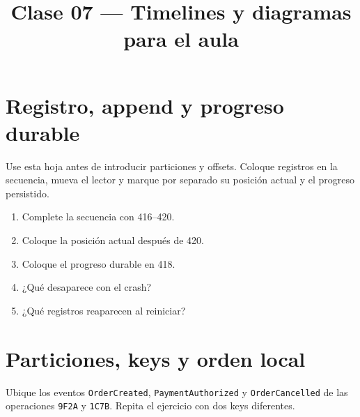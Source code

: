 \documentclass[variant=guia,cover=none,mode=print]{ua-engineering-v6-article}
\title{Clase 07 --- Timelines y diagramas para el aula}
\author{\UAProfessor}
\date{\UADate}
\begin{document}
\maketitle

\section{Registro, append y progreso durable}

Use esta hoja antes de introducir particiones y offsets. Coloque registros en la secuencia, mueva el lector y marque por separado su posición actual y el progreso persistido.

\begin{center}
\end{center}

\begin{enumerate}
\item Complete la secuencia con 416--420. \vspace{0.55cm}
\item Coloque la posición actual después de 420. \vspace{0.55cm}
\item Coloque el progreso durable en 418. \vspace{0.55cm}
\item ¿Qué desaparece con el crash? \hrulefill
\item ¿Qué registros reaparecen al reiniciar? \hrulefill
\end{enumerate}

\newpage
\section{Particiones, keys y orden local}

Ubique los eventos \texttt{OrderCreated}, \texttt{PaymentAuthorized} y \texttt{OrderCancelled} de las operaciones \texttt{9F2A} y \texttt{1C7B}. Repita el ejercicio con dos keys diferentes.
\end{document}
